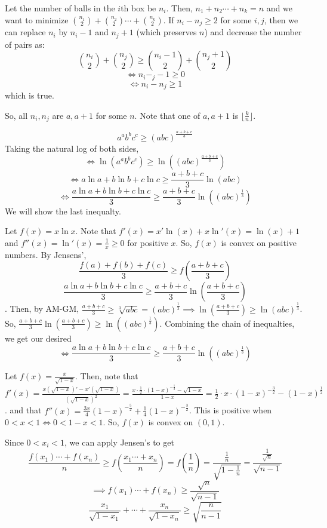 \documentclass[11pt]{article}
\begin{document}
\begin{sol}
Let the number of balls in the  $i$th box be $n_{i}$. Then, $n_{1}+n_{2}\cdots + n_{k}=n$ and we want to minimize $\binom{n_{1}}{2}+\binom{n_{2}}{2}\cdots + \binom{n_{k}}{2}$. If $n_{i}-n_{j}\ge 2$ for some $i,j$, then we can replace $n_{i}$ by $n_{i}-1$ and $n_{j}+1$ (which preserves $n$) and decrease the number of pairs as:
$$\binom{n_{i}}{2}+\binom{n_{j}}{2} \ge \binom{n_{i}-1}{2} + \binom{n_{j}+1}{2}$$
$$\iff n_{i}-_{j}-1\ge 0$$
$$\iff n_{i}-n_{j}\ge 1$$
which is true.

So, all $n_{i},n_{j}$ are $a,a+1$ for some $n$. Note that one of $a,a+1$ is $\lfloor \frac{k}{n} \rfloor$.
\end{sol}


\begin{sol}
$$a^{a}b^{b}c^{c} \ge (abc)^{\frac{a+b+c}{3}}$$
Taking the natural log of both sides, $$\iff \ln (a^{a}b^{b}c^{c}) \ge \ln((abc)^{\frac{a+b+c}{3}})$$
$$\iff a\ln a + b\ln b + c\ln c \ge \frac{a+b+c}{3} \ln(abc)$$
$$\iff \frac{a\ln a + b\ln b + c\ln c}{3} \ge \frac{a+b+c}{3} \ln((abc)^{\frac{1}{3}})$$
We will show the last inequalty.

Let $f(x)=x \ln x$. Note that $f'(x) = x'\ln(x)+x \ln'(x) = \ln(x)+1$ and $f''(x)=\ln'(x)=\frac{1}{x}\ge 0$ for positive $x$. So, $f(x)$ is convex on positive numbers. By Jensens',
$$\frac{f(a)+f(b)+f(c)}{3}\ge f(\frac{a+b+c}{3})$$
$$\frac{a\ln a +  b\ln b + c \ln c}{3} \ge \frac{a+b+c}{3} \ln (\frac{a+b+c}{3})$$.
Then, by AM-GM, $\frac{a+b+c}{3}\ge \sqrt[3]{abc} = (abc)^{\frac{1}{3}}\implies \ln (\frac{a+b+c}{3}) \ge \ln (abc)^{\frac{1}{3}}$. So, $\frac{a+b+c}{3} \ln(\frac{a+b+c}{3}) \ge \ln((abc)^{\frac{1}{3}})$. Combining the chain of inequalties, we get our desired 
$$\iff \frac{a\ln a + b\ln b + c\ln c}{3} \ge \frac{a+b+c}{3} \ln((abc)^{\frac{1}{3}})$$
\end{sol}


\begin{sol}
Let $f(x)=\frac{x}{\sqrt{1-x}}$. Then, note that $f'(x)=\frac{x(\sqrt{1-x})' - x'(\sqrt{1-x})}{(\sqrt{1-x})^2} = \frac{x\cdot \frac{1}{2}\cdot (1-x)^{-\frac{1}{2}} - \sqrt{1-x}}{1-x} = \frac{1}{2}\cdot x \cdot (1-x)^{-\frac{3}{2}} - (1-x)^{\frac{1}{2}}$. and that $f''(x) = \frac{3x}{4}(1-x)^{-\frac{5}{2}} + \frac{1}{4}(1-x)^{-\frac{3}{2}}$. This is positive when $0< x< 1\iff 0< 1-x <1$. So, $f(x)$ is convex on $(0,1)$. 

Since $0<x_{i} <1$, we can apply Jensen's to get 
$$\frac{f(x_{1})\cdots + f(x_{n})}{n} \ge f(\frac{x_{1}\cdots + x_{n}}{n}) = f(\frac{1}{n})=\frac{\frac{1}{n}}{\sqrt{1-\frac{1}{n}}}=\frac{\frac{1}{\sqrt{n}}}{\sqrt{n-1}}$$
$$\implies f(x_{1}) \cdots + f(x_{n}) \ge \frac{\sqrt{n}}{\sqrt{n-1}}$$
$$\frac{x_{1}}{\sqrt{1-x_{1}}} + \cdots + \frac{x_{n}}{\sqrt{1-x_{n}}} \ge \sqrt{\frac{n}{n-1}}$$
\end{sol}
\end{document}
